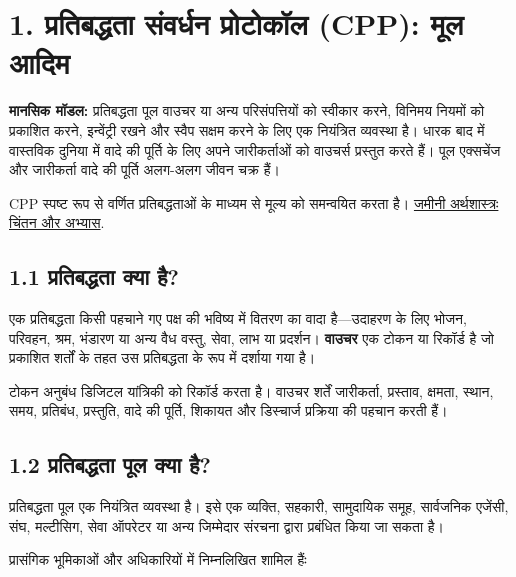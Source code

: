 \documentclass[11pt]{article}
\begin{document}
\section*{1. प्रतिबद्धता संवर्धन प्रोटोकॉल (CPP): मूल आदिम}

\textbf{मानसिक मॉडल:} प्रतिबद्धता पूल वाउचर या अन्य परिसंपत्तियों को स्वीकार करने, विनिमय नियमों को प्रकाशित करने, इन्वेंट्री रखने और स्वैप सक्षम करने के लिए एक नियंत्रित व्यवस्था है। धारक बाद में वास्तविक दुनिया में वादे की पूर्ति के लिए अपने जारीकर्ताओं को वाउचर्स प्रस्तुत करते हैं। पूल एक्सचेंज और जारीकर्ता वादे की पूर्ति अलग-अलग जीवन चक्र हैं।

CPP स्पष्ट रूप से वर्णित प्रतिबद्धताओं के माध्यम से मूल्य को समन्वयित करता है। \href{https://willruddick.substack.com/p/grassroots-economics-the-book-is}{जमीनी अर्थशास्त्रः चिंतन और अभ्यास}.

\subsection*{1.1 प्रतिबद्धता क्या है?}

एक प्रतिबद्धता किसी पहचाने गए पक्ष की भविष्य में वितरण का वादा है---उदाहरण के लिए भोजन, परिवहन, श्रम, भंडारण या अन्य वैध वस्तु, सेवा, लाभ या प्रदर्शन। \textbf{वाउचर} एक टोकन या रिकॉर्ड है जो प्रकाशित शर्तों के तहत उस प्रतिबद्धता के रूप में दर्शाया गया है।

टोकन अनुबंध डिजिटल यांत्रिकी को रिकॉर्ड करता है। वाउचर शर्तें जारीकर्ता, प्रस्ताव, क्षमता, स्थान, समय, प्रतिबंध, प्रस्तुति, वादे की पूर्ति, शिकायत और डिस्चार्ज प्रक्रिया की पहचान करती हैं।

\subsection*{1.2 प्रतिबद्धता पूल क्या है?}

प्रतिबद्धता पूल एक नियंत्रित व्यवस्था है। इसे एक व्यक्ति, सहकारी, सामुदायिक समूह, सार्वजनिक एजेंसी, संघ, मल्टीसिग, सेवा ऑपरेटर या अन्य जिम्मेदार संरचना द्वारा प्रबंधित किया जा सकता है।

प्रासंगिक भूमिकाओं और अधिकारियों में निम्नलिखित शामिल हैंः
\end{document}
